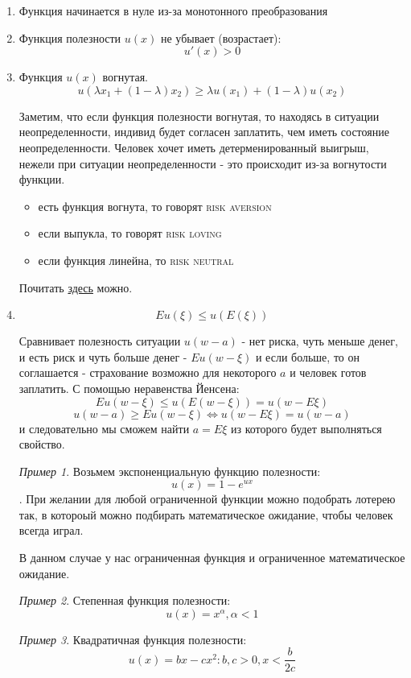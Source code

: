 \documentclass[%
12pt, %
final, %
oneside, %
onecolumn, %
centertags]{article} %
\theoremstyle{plain}
\theoremstyle{definition}
\theoremstyle{remark}
\newtheorem{example}{Пример}
\begin{document}
\begin{enumerate}
	\item Функция начинается в нуле из-за монотонного преобразования
	\item Функция полезности $u(x)$ не убывает (возрастает):
	$$u'(x) > 0$$
	\item Функция $u(x)$ вогнутая. 
	$$u(\lambda x_1 +(1-\lambda)x_2) \geq \lambda u(x_1) + (1-\lambda)u(x_2)$$

	Заметим, что если функция полезности вогнутая, то находясь в ситуации неопределенности, индивид будет согласен заплатить, чем иметь состояние неопределенности. Человек хочет иметь детерменированный выигрыш, нежели при ситуации неопределенности - это происходит из-за вогнутости функции.
	\begin{itemize}
		\item есть функция вогнута, то говорят \textsc{risk aversion}
		\item если выпукла, то говорят \textsc{risk loving}
		\item если функция линейна, то \textsc{risk neutral}
	\end{itemize}

	Почитать \href{https://en.wikipedia.org/wiki/Risk_aversion}{здесь} можно.
	\item $$Eu(\xi) \leq u(E(\xi))$$
	
	Сравнивает полезность ситуации $u(w-a)$ - нет риска, чуть меньше денег, и есть риск и чуть больше денег - $Eu(w-\xi)$ и если больше, то он соглашается - страхование возможно для некоторого $a$ и человек готов заплатить. С помощью неравенства Йенсена:
	$$Eu(w-\xi)\leq u(E(w-\xi)) = u(w-E\xi)$$
	$$u(w-a) \geq Eu(w-\xi) \Leftrightarrow u(w-E\xi) = u(w-a)$$
	и следовательно мы сможем найти $a = E\xi$ из которого будет выполняться свойство.

	\begin{example}
		Возьмем экспоненциальную функцию полезности: $$u(x) = 1-e^{ux}$$. При желании для любой ограниченной функции можно подобрать лотерею так, в котороый можно подбирать математическое ожидание, чтобы человек всегда играл.

		В данном случае у нас ограниченная функция и ограниченное математическое ожидание.
	\end{example}
	\begin{example}
		Степенная функция полезности: $$u(x)=x^{\alpha}, \alpha < 1$$
	\end{example}
	\begin{example}
		Квадратичная функция полезности:
		$$u(x) = bx - cx^2: b,c >0, x < \frac{b}{2c}$$
	\end{example}
\end{enumerate}
\end{document}

